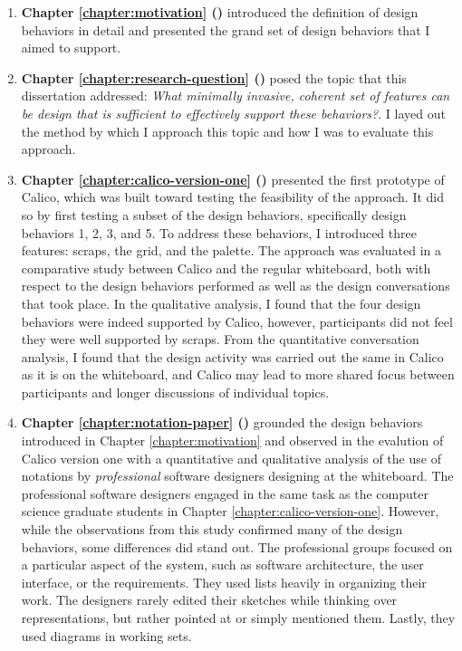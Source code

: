  \begin{enumerate}

   \item \textbf{Chapter \ref{chapter:motivation} ()} introduced the definition of design behaviors in detail and presented the grand set of design behaviors that I aimed to support. 

   \item \textbf{Chapter \ref{chapter:research-question} ()} posed the topic that this dissertation addressed: \textit{What minimally invasive, coherent set of features can be design that is sufficient to effectively support these behaviors?}. I layed out the method by which I approach this topic and how I was to evaluate this approach.

   \item \textbf{Chapter \ref{chapter:calico-version-one} ()} presented the first prototype of Calico, which was built toward testing the feasibility of the approach. It did so by first testing a subset of the design behaviors, specifically design behaviors 1, 2, 3, and 5. To address these behaviors, I introduced three features: scraps, the grid, and the palette. The approach was evaluated in a comparative study between Calico and the regular whiteboard, both with respect to the design behaviors performed as well as the design conversations that took place. In the qualitative analysis, I found that the four design behaviors were indeed supported by Calico, however, participants did not feel they were well supported by scraps. From the quantitative conversation analysis, I found that the design activity was carried out the same in Calico as it is on the whiteboard, and Calico may lead to more shared focus between participants and longer discussions of individual topics.

   \item \textbf{Chapter \ref{chapter:notation-paper} ()} grounded the design behaviors introduced in Chapter \ref{chapter:motivation} and observed in the evalution of Calico version one with a quantitative and qualitative analysis of the use of notations by \emph{professional} software designers designing at the whiteboard. The professional software designers engaged in the same task as the computer science graduate students in Chapter \ref{chapter:calico-version-one}. However, while the observations from this study confirmed many of the design behaviors, some differences did stand out. The professional groups focused on a particular aspect of the system, such as software architecture, the user interface, or the requirements. They used lists heavily in organizing their work. The designers rarely edited their sketches while thinking over representations, but rather pointed at or simply mentioned them. Lastly, they used diagrams in working sets.


\end{enumerate}
